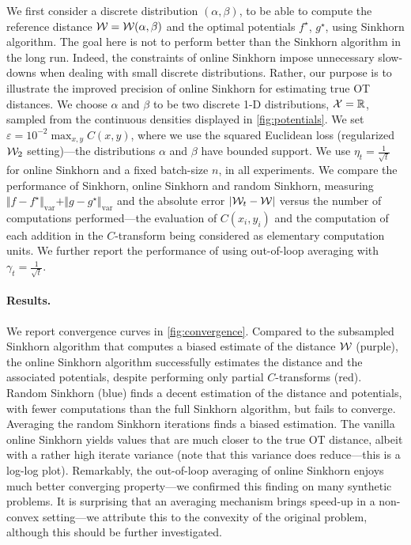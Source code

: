 We first consider a discrete distribution $(\alpha, \beta)$, to be able to
compute the reference distance $\mathcal{W} = \mathcal{W}(\alpha, \beta)$ and the optimal
potentials $f^\star$, $g^\star$, using Sinkhorn algorithm. The goal here is not
to perform better than the Sinkhorn algorithm in the long run. Indeed, the
constraints of online Sinkhorn impose unnecessary slow-downs when dealing with
small discrete distributions. Rather, our purpose is to illustrate the improved
precision of online Sinkhorn for estimating true OT distances. We choose $\alpha$ and $\beta$ to be two
discrete 1-D distributions, $\mathcal{X}=\mathbb{R}$, sampled from the continuous densities
displayed in
\autoref{fig:potentials}. We set $\varepsilon = 10^{-2} \max_{x,y}
C(x,y)$, where we use the squared Euclidean loss (regularized $\mathcal{W}_2$
setting)---the distributions $\alpha$ and $\beta$ have bounded support. We use
$\eta_t = \frac{1}{\sqrt{t}}$ for online Sinkhorn and a fixed batch-size $n$, in
all experiments. We compare the performance of Sinkhorn, online Sinkhorn and
random Sinkhorn, measuring $\Vert f - f^\star \Vert_{\text{var}} + \Vert g -
g^\star \Vert_{\text{var}}$ and the absolute error $| \mathcal{W}_t - \mathcal{W} |$ versus the
number of computations performed---the evaluation of $C(x_i, y_i)$ and the
computation of each addition in the $C$-transform being considered as elementary
computation units. We further report the performance of using out-of-loop
averaging with $\gamma_t = \frac{1}{\sqrt{t}}$.

\paragraph{Results.} We report convergence curves in \autoref{fig:convergence}.
Compared to the subsampled Sinkhorn algorithm that computes a biased estimate of
the distance $\mathcal{W}$ (purple), the online Sinkhorn algorithm successfully
estimates the distance and the associated potentials, despite performing only
partial $C$-transforms (red). Random Sinkhorn (blue) finds a decent estimation
of the distance and potentials, with fewer computations than the full Sinkhorn
algorithm, but fails to converge. Averaging the random Sinkhorn iterations finds
a biased estimation. The vanilla online Sinkhorn yields values that are much
closer to the true OT distance, albeit with a rather high iterate variance (note
that this variance does reduce---this is a log-log plot). Remarkably, the
out-of-loop averaging of online Sinkhorn enjoys much better converging
property---we confirmed this finding on many synthetic problems. It is
surprising that an averaging mechanism brings speed-up in a non-convex
setting---we attribute this to the convexity of the original problem, although
this should be further investigated.

